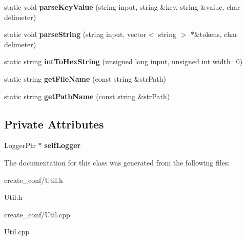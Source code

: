 \begin{DoxyCompactItemize}
\item 
\hypertarget{classUtil_abc85aa3371ebf073f9f8ff45803a8429}{static void {\bfseries parse\-Key\-Value} (string input, string \&key, string \&value, char delimeter)}\label{classUtil_abc85aa3371ebf073f9f8ff45803a8429}

\item 
\hypertarget{classUtil_ae7dcd3555c739d187a9f981bd27173a6}{static void {\bfseries parse\-String} (string input, vector$<$ string $>$ $\ast$\&tokens, char delimeter)}\label{classUtil_ae7dcd3555c739d187a9f981bd27173a6}

\item 
\hypertarget{classUtil_a7c86a9720231bcfdf98741ab707e80ae}{static string {\bfseries int\-To\-Hex\-String} (unsigned long input, unsigned int width=0)}\label{classUtil_a7c86a9720231bcfdf98741ab707e80ae}

\item 
\hypertarget{classUtil_a6a55501d7873fbcce7e4aab241f8ef44}{static string {\bfseries get\-File\-Name} (const string \&str\-Path)}\label{classUtil_a6a55501d7873fbcce7e4aab241f8ef44}

\item 
\hypertarget{classUtil_acecfd7b35ea5073919ff69f0299b70a8}{static string {\bfseries get\-Path\-Name} (const string \&str\-Path)}\label{classUtil_acecfd7b35ea5073919ff69f0299b70a8}

\end{DoxyCompactItemize}
\subsection*{\-Private \-Attributes}
\begin{DoxyCompactItemize}
\item 
\hypertarget{classUtil_a6328b8b76de455d549220553437e3026}{\-Logger\-Ptr $\ast$ {\bfseries self\-Logger}}\label{classUtil_a6328b8b76de455d549220553437e3026}

\end{DoxyCompactItemize}


\-The documentation for this class was generated from the following files\-:\begin{DoxyCompactItemize}
\item 
create\-\_\-conf/\-Util.\-h\item 
\-Util.\-h\item 
create\-\_\-conf/\-Util.\-cpp\item 
\-Util.\-cpp\end{DoxyCompactItemize}
